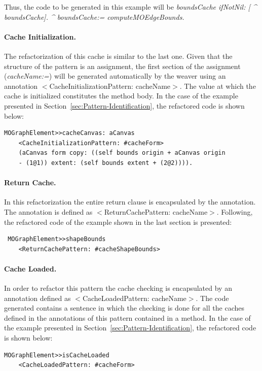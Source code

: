 \documentclass[preprint,10pt]{sigplanconf}
\newcommand{\secref}[1]{Section~\ref{sec:#1}\xspace}
\begin{document}
Thus, the code to be generated in this example will be \emph{boundsCache
ifNotNil: {[} \textasciicircum{} boundsCache{]}. \textasciicircum{}
boundsCache:= computeMOEdgeBounds.}

\paragraph{Cache Initialization.} The refactorization of this cache is
similar to the last one. Given that the structure of the pattern is
an assignment, the first section of the assignment (\emph{cacheName:=})
will be generated automatically by the weaver using an annotation $<$CacheInitializationPattern: cacheName$>$.
The value at which the cache is initialized constitutes the method body.
In the case of the example presented in \secref{Pattern-Identification},
the refactored code is shown below:

\begin{lstlisting} 
MOGraphElement>>cacheCanvas: aCanvas 
	<CacheInitializationPattern: #cacheForm>  
	(aCanvas form copy: ((self bounds origin + aCanvas origin
	- (1@1)) extent: (self bounds extent + (2@2)))). 
\end{lstlisting}

\paragraph{Return Cache.} In this refactorization the entire return clause
is encapsulated by the annotation. The annotation is defined as $<$ReturnCachePattern:
cacheName$>$. Following, the refactored code of the example shown in
the last section is presented:

\begin{lstlisting}
 MOGraphElement>>shapeBounds 
	<ReturnCachePattern: #cacheShapeBounds> 
\end{lstlisting}

\paragraph{Cache Loaded.} In order to refactor this pattern the cache checking
is encapsulated by an annotation defined as $<$Cache\-Loaded\-Pattern:
cacheName$>$. The code generated contains a sentence in which the checking
is done for all the caches defined in the annotations of this pattern
contained in a method. In the case of the example presented in \secref{Pattern-Identification}, the refactored code is shown below:
\begin{lstlisting} 
MOGraphElement>>isCacheLoaded 
	<CacheLoadedPattern: #cacheForm>
\end{lstlisting}
\end{document}
